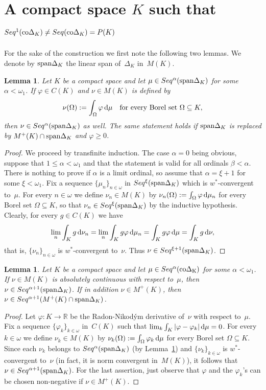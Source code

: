 \documentclass[12pt]{amsart}
\newcommand{\vf}{\varphi}
\newcommand{\sub}{\subseteq}
\newcommand{\lin}{\protect{\rm span}}
\newcommand{\er}{\mathbb R}
\newcommand{\0}{\protect{\bf 0}}
\newcommand{\1}{\protect{\bf 1}}
\newtheorem{lem}[theo]{Lemma}%
\theoremstyle{definition}
\theoremstyle{remark}
\numberwithin{equation}{section}
\begin{document}
\section{A compact space $K$ such that $Seq^1({\rm co}\Delta_K) \neq Seq({\rm co}\Delta_K) = P(K)$}\label{ex1}

For the sake of the construction we first note the following two lemmas.
We denote by $\lin\Delta_K$ the linear span of~$\Delta_K$ in~$M(K)$. 

\begin{lem}\label{seq_abs_cont2}
Let $K$ be a compact space and let $\mu\in Seq^{\alpha}(\lin \Delta_K)$ for some $\alpha<\omega_1$.
If $\vf\in C(K)$ and $\nu\in M(K)$ is defined by  
$$
	\nu(\Omega):=\int_\Omega \vf\, {\rm d}\mu \quad
	\mbox{for every Borel set }\Omega \sub K,
$$
then $\nu \in Seq^{\alpha}(\lin\Delta_K)$ as well. The same statement holds if $\lin\Delta_K$
is replaced by $M^+(K)\cap \lin\Delta_K$ and $\vf \geq 0$.
\end{lem}
\begin{proof} We proceed by transfinite induction. The case $\alpha=0$ being obvious,
suppose that $1\leq \alpha < \omega_1$ and that the statement is valid for all ordinals $\beta<\alpha$. There is nothing to prove
if $\alpha$ is a limit ordinal, so assume that $\alpha=\xi+1$ for some $\xi<\omega_1$.
Fix a sequence $\{\mu_n\}_{n\in \omega}$ in $Seq^\xi(\lin\Delta_K)$ which is $w^*$-convergent to~$\mu$. 
For every $n\in \omega$ we define $\nu_n\in M(K)$ by 
$\nu_n(\Omega):=\int_\Omega \vf\, {\rm d}\mu_n$ for every Borel set $\Omega \sub K$,
so that $\nu_n\in Seq^\xi(\lin\Delta_K)$ by the inductive hypothesis.
Clearly, for every $g\in C(K)$ we have
$$
	\lim_n \int_K g \, {\rm d}\nu_n = \lim_ n\int_K  g\vf \,{\rm d}\mu_n = 
	\int_K  g\vf\, {\rm d}\mu=\int_K g\, {\rm d}\nu,
$$
that is, $\{\nu_n\}_{n\in \omega}$ is $w^*$-convergent to~$\nu$.
Thus $\nu\in Seq^{\xi+1}(\lin\Delta_K)$.
\end{proof}

\begin{lem}\label{seq_abs_cont}
Let $K$ be a compact space and let $\mu\in Seq^{\alpha}({\rm co \Delta_K})$ for some $\alpha<\omega_1$.
If $\nu\in M(K)$ is absolutely continuous with respect to~$\mu$, then 
$\nu\in Seq^{\alpha+1}(\lin\Delta_K)$. If in addition $\nu\in M^+(K)$, then $\nu\in Seq^{\alpha+1}(M^+(K)\cap \lin\Delta_K)$.
\end{lem}
\begin{proof}
Let $\vf:K\to\er$ be the Radon-Nikod\'ym derivative of~$\nu$ with respect to~$\mu$.
Fix a sequence $\{\vf_k\}_{k\in \omega}$ in~$C(K)$
such that $\lim_{k}\int_K |\vf-\vf_k|\,{\rm d}\mu=0$. For every $k\in \omega$
we define $\nu_k\in M(K)$ by 
$\nu_k(\Omega):=\int_\Omega \vf_k\, {\rm d}\mu$ for every Borel set $\Omega \sub K$.
Since each $\nu_k$ belongs to $Seq^\alpha(\lin\Delta_K)$ (by Lemma~\ref{seq_abs_cont2})
and $\{\nu_k\}_{k\in \omega}$ is $w^*$-convergent to~$\nu$ (in fact, it is norm convergent in~$M(K)$),
it follows that $\nu\in Seq^{\alpha+1}(\lin\Delta_K)$. For the last assertion, just
observe that $\varphi$ and the $\varphi_k$'s can be chosen non-negative if $\nu\in M^+(K)$.
\end{proof}
\end{document}
